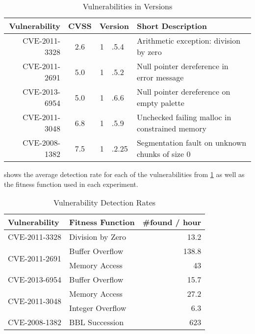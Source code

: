\begin{table}[H]
\centering
\begin{tabular}{|r|c|r@{}l|l|}
\hline
Vulnerability & CVSS  & \multicolumn{2}{c|}{Version} & Short Description \\ \hline \hline 
CVE-2011-3328 & 2.6   & 1&.5.4 	& Arithmetic exception: division by zero   \\ \hline  %
CVE-2011-2691 & 5.0   & 1&.5.2	& Null pointer dereference in error message \\ \hline %
CVE-2013-6954 & 5.0   & 1&.6.6  & Null pointer dereference on empty palette \\ \hline %
CVE-2011-3048 & 6.8   & 1&.5.9  & Unchecked failing malloc in constrained memory \\ \hline %
CVE-2008-1382 & 7.5   & 1&.2.25 & Segmentation fault on unknown chunks of size 0\\ \hline %
\end{tabular}
\caption{Vulnerabilities in \libpng Versions}
\label{tbl:png:vulns}
\end{table}

 shows the average detection rate for each of the vulnerabilities from \cref{tbl:png:vulns}
as well as the fitness function used in each experiment.

\begin{table}[H]
\centering
\begin{tabular}{|l|l|r|}
\hline
Vulnerability                  & Fitness Function & \#found / hour \\ \hline \hline
CVE-2011-3328                  & Division by Zero & 13.2           \\ \hline
\multirow{2}{*}{CVE-2011-2691} & Buffer Overflow  & 138.8          \\ \cline{2-3} 
                               & Memory Access    & 43             \\ \hline
CVE-2013-6954                  & Buffer Overflow  & 15.7           \\ \hline
\multirow{2}{*}{CVE-2011-3048} & Memory Access    & 27.2           \\ \cline{2-3}
							   & Integer Overflow & 6.3			   \\ \hline
CVE-2008-1382                  & BBL Succession   & 623            \\ \hline
\end{tabular}
\caption{Vulnerability Detection Rates}
\label{tbl:png:rates}
\end{table}

